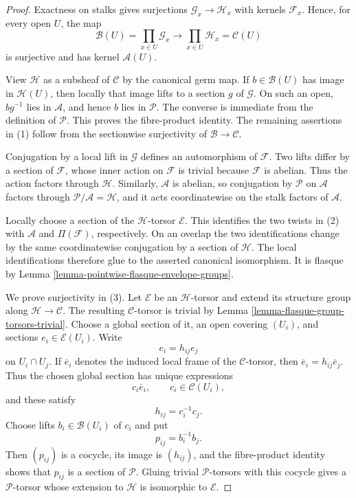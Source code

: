 \begin{proof}
Exactness on stalks gives surjections
$\mathcal G_x\to\mathcal H_x$ with kernels $\mathcal F_x$. Hence, for
every open $U$, the map
$$
\mathcal B(U)=\prod_{x\in U}\mathcal G_x
\longrightarrow
\prod_{x\in U}\mathcal H_x=\mathcal C(U)
$$
is surjective and has kernel $\mathcal A(U)$.

View $\mathcal H$ as a subsheaf of $\mathcal C$ by the canonical germ
map. If $b\in\mathcal B(U)$ has image in $\mathcal H(U)$, then locally
that image lifts to a section $g$ of $\mathcal G$. On such an open,
$bg^{-1}$ lies in $\mathcal A$, and hence $b$ lies in $\mathcal P$.
The converse is immediate from the definition of $\mathcal P$. This
proves the fibre-product identity. The remaining assertions in (1) follow
from the sectionwise surjectivity of $\mathcal B\to\mathcal C$.

Conjugation by a local lift in $\mathcal G$ defines an automorphism of
$\mathcal F$. Two lifts differ by a section of $\mathcal F$, whose inner
action on $\mathcal F$ is trivial because $\mathcal F$ is abelian. Thus
the action factors through $\mathcal H$. Similarly, $\mathcal A$ is
abelian, so conjugation by $\mathcal P$ on $\mathcal A$ factors through
$\mathcal P/\mathcal A=\mathcal H$, and it acts coordinatewise on the
stalk factors of $\mathcal A$.

Locally choose a section of the $\mathcal H$-torsor $\mathcal E$. This
identifies the two twists in (2) with $\mathcal A$ and
$\Pi(\mathcal F)$, respectively. On an overlap the two identifications
change by the same coordinatewise conjugation by a section of
$\mathcal H$. The local identifications therefore glue to the asserted
canonical isomorphism. It is flasque by
Lemma \ref{lemma-pointwise-flasque-envelope-groups}.

We prove surjectivity in (3). Let $\mathcal E$ be an
$\mathcal H$-torsor and extend its structure group along
$\mathcal H\to\mathcal C$. The resulting $\mathcal C$-torsor is trivial
by Lemma \ref{lemma-flasque-group-torsors-trivial}. Choose a global
section of it, an open covering $(U_i)$, and sections
$e_i\in\mathcal E(U_i)$. Write
$$
e_i=h_{ij}e_j
$$
on $U_i\cap U_j$. If $\overline e_i$ denotes the induced local frame of
the $\mathcal C$-torsor, then
$\overline e_i=h_{ij}\overline e_j$. Thus the chosen global section has
unique expressions
$$
c_i\overline e_i,\qquad c_i\in\mathcal C(U_i),
$$
and these satisfy
$$
h_{ij}=c_i^{-1}c_j.
$$
Choose lifts $b_i\in\mathcal B(U_i)$ of $c_i$ and put
$$
p_{ij}=b_i^{-1}b_j.
$$
Then $(p_{ij})$ is a cocycle, its image is $(h_{ij})$, and the
fibre-product identity shows that $p_{ij}$ is a section of $\mathcal P$.
Gluing trivial $\mathcal P$-torsors with this cocycle gives a
$\mathcal P$-torsor whose extension to $\mathcal H$ is isomorphic to
$\mathcal E$.


\end{proof}
